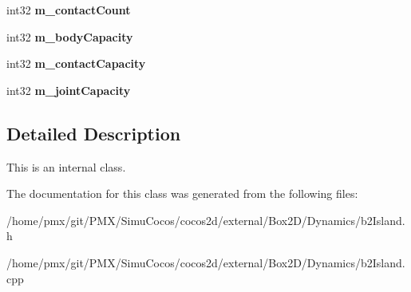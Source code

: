 \begin{DoxyCompactItemize}
$$int32 {\bfseries m\+\_\+contact\+Count}
\item 
\mbox{\label{classb2Island_a5ea371889bb93fb6387ff2ab427191ed}} 
int32 {\bfseries m\+\_\+body\+Capacity}
\item 
\mbox{\label{classb2Island_a1a65b8fc8256ca443f85e6ae6f2d841a}} 
int32 {\bfseries m\+\_\+contact\+Capacity}
\item 
\mbox{\label{classb2Island_a9b6e63c89307d469e1075585d65a9bbb}} 
int32 {\bfseries m\+\_\+joint\+Capacity}
\end{DoxyCompactItemize}


\subsection{Detailed Description}
This is an internal class. 

The documentation for this class was generated from the following files\+:\begin{DoxyCompactItemize}
\item 
/home/pmx/git/\+P\+M\+X/\+Simu\+Cocos/cocos2d/external/\+Box2\+D/\+Dynamics/b2\+Island.\+h\item 
/home/pmx/git/\+P\+M\+X/\+Simu\+Cocos/cocos2d/external/\+Box2\+D/\+Dynamics/b2\+Island.\+cpp\end{DoxyCompactItemize}
